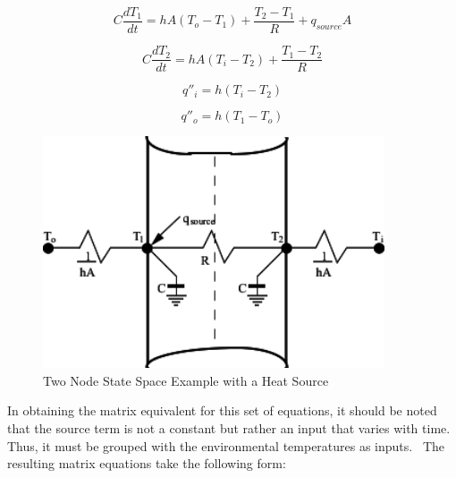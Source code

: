 \begin{equation}
C\frac{{d{T_1}}}{{dt}} = hA\left( {{T_o} - {T_1}} \right) + \frac{{{T_2} - {T_1}}}{R} + {q_{source}}A
\end{equation}

\begin{equation}
C\frac{{d{T_2}}}{{dt}} = hA\left( {{T_i} - {T_2}} \right) + \frac{{{T_1} - {T_2}}}{R}
\end{equation}

\begin{equation}
{q''_i} = h\left( {{T_i} - {T_2}} \right)
\end{equation}

\begin{equation}
{q''_o} = h\left( {{T_1} - {T_o}} \right)
\end{equation}

\begin{figure}[hbtp] %
\centering
\includegraphics[width=0.9\textwidth, height=0.9\textheight, keepaspectratio=true]{media/image6034.svg.png}
\caption{Two Node State Space Example with a Heat Source \protect \label{fig:two-node-state-space-example-with-a-heat}}
\end{figure}

In obtaining the matrix equivalent for this set of equations, it should be noted that the source term is not a constant but rather an input that varies with time.~ Thus, it must be grouped with the environmental temperatures as inputs.~ The resulting matrix equations take the following form:

